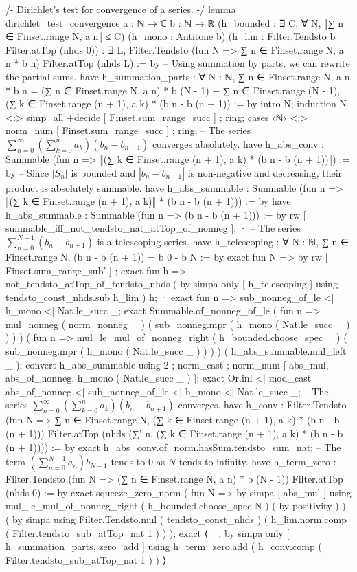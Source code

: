 /-
Dirichlet's test for convergence of a series.
-/
lemma dirichlet_test_convergence {a : ℕ → ℂ} {b : ℕ → ℝ}
  (h_bounded : ∃ C, ∀ N, ‖∑ n ∈ Finset.range N, a n‖ ≤ C)
  (h_mono : Antitone b)
  (h_lim : Filter.Tendsto b Filter.atTop (nhds 0)) :
  ∃ L, Filter.Tendsto (fun N => ∑ n ∈ Finset.range N, a n * b n) Filter.atTop (nhds L) := by
    -- Using summation by parts, we can rewrite the partial sums.
    have h_summation_parts : ∀ N : ℕ, ∑ n ∈ Finset.range N, a n * b n = (∑ n ∈ Finset.range N, a n) * b (N - 1) + ∑ n ∈ Finset.range (N - 1), (∑ k ∈ Finset.range (n + 1), a k) * (b n - b (n + 1)) := by
      intro N; induction N <;> simp_all +decide [ Finset.sum_range_succ ] ; ring;
      cases ‹ℕ› <;> norm_num [ Finset.sum_range_succ ] ; ring;
    -- The series $\sum_{n=0}^{\infty} (\sum_{k=0}^{n} a_k) (b_n - b_{n+1})$ converges absolutely.
    have h_abs_conv : Summable (fun n => ‖(∑ k ∈ Finset.range (n + 1), a k) * (b n - b (n + 1))‖) := by
      -- Since $|S_n|$ is bounded and $|b_n - b_{n+1}|$ is non-negative and decreasing, their product is absolutely summable.
      have h_abs_summable : Summable (fun n => ‖(∑ k ∈ Finset.range (n + 1), a k)‖ * (b n - b (n + 1))) := by
        have h_abs_summable : Summable (fun n => (b n - b (n + 1))) := by
          rw [ summable_iff_not_tendsto_nat_atTop_of_nonneg ];
          · -- The series $\sum_{n=0}^{N-1} (b_n - b_{n+1})$ is a telescoping series.
            have h_telescoping : ∀ N : ℕ, ∑ n ∈ Finset.range N, (b n - b (n + 1)) = b 0 - b N := by
              exact fun N => by rw [ Finset.sum_range_sub' ] ;
            exact fun h => not_tendsto_atTop_of_tendsto_nhds ( by simpa only [ h_telescoping ] using tendsto_const_nhds.sub h_lim ) h;
          · exact fun n => sub_nonneg_of_le <| h_mono <| Nat.le_succ _;
        exact Summable.of_nonneg_of_le ( fun n => mul_nonneg ( norm_nonneg _ ) ( sub_nonneg.mpr ( h_mono ( Nat.le_succ _ ) ) ) ) ( fun n => mul_le_mul_of_nonneg_right ( h_bounded.choose_spec _ ) ( sub_nonneg.mpr ( h_mono ( Nat.le_succ _ ) ) ) ) ( h_abs_summable.mul_left _ );
      convert h_abs_summable using 2 ; norm_cast ; norm_num [ abs_mul, abs_of_nonneg, h_mono ( Nat.le_succ _ ) ];
      exact Or.inl <| mod_cast abs_of_nonneg <| sub_nonneg_of_le <| h_mono <| Nat.le_succ _;
    -- The series $\sum_{n=0}^{\infty} (\sum_{k=0}^{n} a_k) (b_n - b_{n+1})$ converges.
    have h_conv : Filter.Tendsto (fun N => ∑ n ∈ Finset.range N, (∑ k ∈ Finset.range (n + 1), a k) * (b n - b (n + 1))) Filter.atTop (nhds (∑' n, (∑ k ∈ Finset.range (n + 1), a k) * (b n - b (n + 1)))) := by
      exact h_abs_conv.of_norm.hasSum.tendsto_sum_nat;
    -- The term $(\sum_{n=0}^{N-1} a_n) b_{N-1}$ tends to $0$ as $N$ tends to infinity.
    have h_term_zero : Filter.Tendsto (fun N => (∑ n ∈ Finset.range N, a n) * b (N - 1)) Filter.atTop (nhds 0) := by
      exact squeeze_zero_norm ( fun N => by simpa [ abs_mul ] using mul_le_mul_of_nonneg_right ( h_bounded.choose_spec N ) ( by positivity ) ) ( by simpa using Filter.Tendsto.mul ( tendsto_const_nhds ) ( h_lim.norm.comp ( Filter.tendsto_sub_atTop_nat 1 ) ) );
    exact ⟨ _, by simpa only [ h_summation_parts, zero_add ] using h_term_zero.add ( h_conv.comp ( Filter.tendsto_sub_atTop_nat 1 ) ) ⟩


